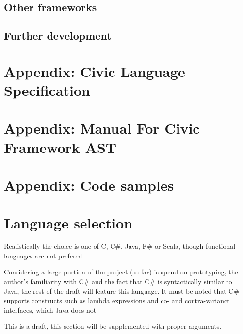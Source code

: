 \documentclass[final,a4paper,12pt]{article}
\begin{document}
\subsection{Other frameworks}
\subsection{Further development}

\section{Appendix: Civic Language Specification}
\section{Appendix: Manual For Civic Framework AST}
\section{Appendix: Code samples}

\section*{Language selection}
Realistically the choice is one of C, C\#, Java, F\# or Scala, though functional languages are not prefered.

Considering a large portion of the project (so far) is spend on prototyping, the author's familiarity with C\# and the fact that C\# is syntactically similar to Java, the rest of the draft will feature this language. It must be noted that C\# supports constructs such as lambda expressions and co- and contra-varianct interfaces, which Java does not.

This is a draft, this section will be supplemented with proper arguments. 
\end{document}

